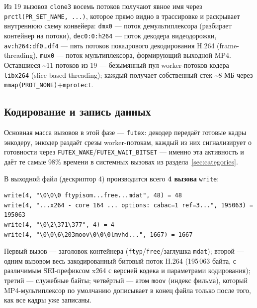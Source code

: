 \documentclass[12pt,a4paper]{article}
\begin{document}
Из 19 вызовов \texttt{clone3} восемь потоков получают явное имя через
\texttt{prctl(PR\_SET\_NAME, ...)}, которое прямо видно в трассировке и
раскрывает внутреннюю схему конвейера: \texttt{dmx0} — поток демультиплексора
(разбирает контейнер на потоки), \texttt{dec0:0:h264} — поток декодера
видеодорожки, \texttt{av:h264:df0}…\texttt{df4} — пять потоков покадрового
декодирования H.264 (frame-threading), \texttt{mux0} — поток мультиплексора,
формирующий выходной MP4. Оставшиеся \textasciitilde11 потоков из 19 —
безымянный пул worker-потоков кодера \texttt{libx264} (slice-based threading);
каждый получает собственный стек \textasciitilde8 МБ через
\texttt{mmap(PROT\_NONE)}+\texttt{mprotect}.

\subsection{Кодирование и запись данных}
Основная масса вызовов в этой фазе — \texttt{futex}: декодер передаёт готовые
кадры энкодеру, энкодер раздаёт срезы worker-потокам, каждый из них
сигнализирует о готовности через \texttt{FUTEX\_WAKE}/\texttt{FUTEX\_WAIT\_BITSET} —
именно эта активность и даёт те самые 98\% времени в системных вызовах
из раздела~\ref{sec:categories}.

В выходной файл (дескриптор 4) производится всего \textbf{4 вызова}
\texttt{write}:
\begin{lstlisting}
write(4, "\0\0\0 ftypisom...free...mdat", 48) = 48
write(4, "...x264 - core 164 ... options: cabac=1 ref=3...", 195063) = 195063
write(4, "\0\2\371\377", 4) = 4
write(4, "\0\0\6\203moov\0\0\0lmvhd...", 1667) = 1667
\end{lstlisting}
Первый вызов — заголовок контейнера (\texttt{ftyp}/\texttt{free}/заглушка
\texttt{mdat}); второй — одним вызовом весь закодированный битовый поток H.264
(195\,063 байта, с различимым SEI-префиксом x264 с версией кодека и
параметрами кодирования); третий — служебные байты; четвёртый —
атом \texttt{moov} (индекс фильма), который MP4-мультиплексор по умолчанию
дописывает в конец файла только после того, как все кадры уже записаны.
\end{document}
